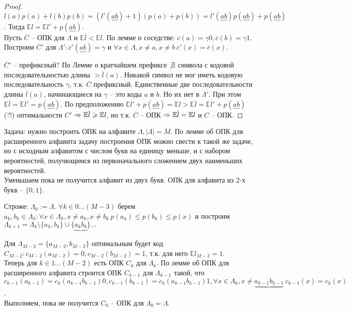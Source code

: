 	\begin{proof}
		$l(a) p(a) + l(b)p(b) = (l'(\underbrace{ab}) + 1)(p(a) + p(b)) = l'(\underbrace{ab})p(\underbrace{ab}) + p(\underbrace{ab})$. Тогда $\mathbb{E} l = \mathbb{E} l' + p(\underbrace{ab})$. \\
		Пусть $\overline{C}$ -- ОПК для $\Lambda$ и $\mathbb{E} \overline{l} < \mathbb{E} l$. По лемме о соседстве: $\overline{c}(a) = \gamma 0, \overline{c}(b) = \gamma 1$.
		Построим $\overline{C}'$ для $\Lambda' : \overline{c}'(\underbrace{ab}) = \gamma$ и $\forall x \in \Lambda, x \neq a, x \neq b \ \overline{c}'(x) = \overline{c}(x)$. 

		$\overline{C}'$ -- префиксный? По Лемме о кратчайшем префиксе $\not\exists $ символа с кодовой последовательностью длины $> \overline{l}(a)$.
		Никакой символ не мог иметь кодовую последовательность $\gamma$, т.к. $\overline{C}$ префиксный. Единственные две последовательности длины $\overline{l}(a)$, начинающиеся на $\gamma$ -- это коды $a$ и $b$.
		Но их нет в $\Lambda'$. При этом $\mathbb{E} \overline{l} = \mathbb{E} \overline{l}' = p(\underbrace{ab})$.
		По предположению $\mathbb{E}l' + p(\underbrace{ab}) = \mathbb{E}l > \mathbb{E} \overline{l} = \mathbb{E} \overline{l}' + p(\underbrace{ab})$ (?!) оптимальности $C'$ 
		$\Rightarrow \mathbb{E} \overline{l} \geqslant \mathbb{E}l$, но т.к. $\overline{C}$ -- ОПК $\Rightarrow \mathbb{E} \overline{l} = \mathbb{E} l$ и $C$ -- ОПК.
	\end{proof}

	Задача: нужно построить ОПК на алфавите $\Lambda, |\Lambda| = M$. По лемме об ОПК для расширенного алфавита задачу построения ОПК можно свести к такой же задаче, но с исходным алфавитом с числом букв на единицу меньше,
	и с набором вероятностей, получющимся из первоначального сложением двух наименьших вероятностей. \\
	Уменьшаем пока не получится алфавит из двух букв. ОПК для алфавита из 2-х букв -- $\{0, 1\}$.

	Строже: $\Lambda_0 := \Lambda$. $\forall k \in 0...(M - 3)$ берем $a_k, b_k \in \Lambda_k : \forall x \in \Lambda_k, x \neq a_k, x \neq b_k \ p(a_k) \leqslant p(b_k) \leqslant p(x)$ 
	и построим $\Lambda_{k + 1} = \Lambda_{k} \setminus \{a_k, b_k\} \cup \{\underbrace{a_kb_k}\}...$
	
	Для $\Lambda_{M - 2} = \{a_{M - 2}, b_{M - 2}\}$ оптимальным будет код $C_{M - 2} : c_{M - 2} (a_{M - 2}) = 0, c_{M - 2}(b_{M - 2}) = 1$,
	т.к. для него $\mathbb{E} l_{M - 2} = 1$. \\
	Теперь для $k \in 1 ... (M - 2)$ есть ОПК $C_k$ для $\Lambda_k$. По лемме об ОПК для расширенного алфавита строится ОПК $C_{k - 1}$ для $\Lambda_{k - 1}$ такой, что 
	$c_{k - 1} (a_{k - 1}) = c_k(a_{k - 1}b_{k - 1})0, c_{k - 1}(b_{k - 1}) = c_k (a_{k - 1}b_{k - 1})1, \forall x \in \Lambda_k, x \neq \underbrace{a_{k - 1}b_{k - 1}} \ c_{k - 1}(x) = c_k(x)$. \\
	Выполняем, пока не получится $C_0$ -- ОПК для $\Lambda_0 = \Lambda$.

